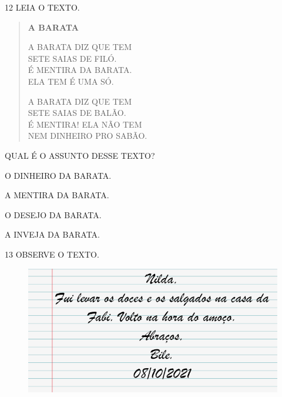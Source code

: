 \num{12} LEIA O TEXTO.

\begin{myquote}
\begin{verse}
\textbf{A BARATA}

A BARATA DIZ QUE TEM\\
SETE SAIAS DE FILÓ.\\
É MENTIRA DA BARATA.\\
ELA TEM É UMA SÓ.


A BARATA DIZ QUE TEM\\
SETE SAIAS DE BALÃO.\\
É MENTIRA! ELA NÃO TEM\\
NEM DINHEIRO PRO SABÃO.
\end{verse}

\end{myquote}

\pagebreak

QUAL É O ASSUNTO DESSE TEXTO?

\begin{escolha}
\item O DINHEIRO DA BARATA.

\item A MENTIRA DA BARATA.

\item O DESEJO DA BARATA.

\item A INVEJA DA BARATA.
\end{escolha}

\num{13} OBSERVE O TEXTO.

\begin{figure}[htpb]
\centering
\includegraphics[width=\textwidth]{media/image220.png}
\end{figure}

